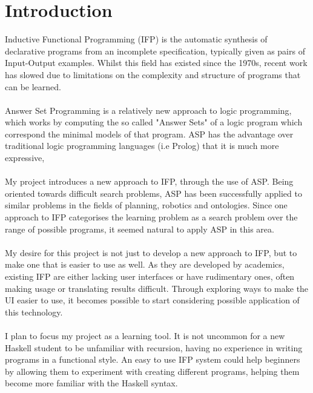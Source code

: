 \chapter{Introduction}

Inductive Functional Programming (IFP) is the automatic synthesis of declarative programs from an incomplete specification, typically given as pairs of Input-Output examples. Whilst this field has existed since the 1970s, recent work has slowed due to limitations on the complexity and structure of programs that can be learned. \\ \\
Answer Set Programming is a relatively new approach to logic programming, which works by computing the so called "Answer Sets" of a logic program which correspond the minimal models of that program. ASP has the advantage over traditional logic programming languages (i.e Prolog) that it is much more expressive,  \\ \\
My project introduces a new approach to IFP, through the use of ASP. Being oriented towards difficult search problems, ASP has been successfully applied to similar problems in the fields of planning, robotics and ontologies. Since one approach to IFP categorises the learning problem as a search problem over the range of possible programs, it seemed natural to apply ASP in this area. \\ \\
My desire for this project is not just to develop a new approach to IFP, but to make one that is easier to use as well. As they are developed by academics, existing IFP are either lacking user interfaces or have rudimentary ones, often making usage or translating results difficult. Through exploring ways to make the UI easier to use, it becomes possible to start considering possible application of this technology. \\ \\
I plan to focus my project as a learning tool. It is not uncommon for a new Haskell student to be unfamiliar with recursion, having no experience in writing programs in a functional style. An easy to use IFP system could help beginners by allowing them to experiment with creating different programs, helping them become more familiar with the Haskell syntax.

\pagebreak
%
%